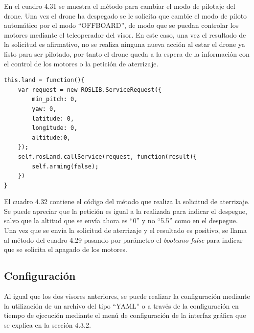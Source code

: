 En el cuadro 4.31 se muestra el método para cambiar el modo de pilotaje del drone. Una vez el drone ha despegado se le solicita que cambie el modo de piloto automático por el modo ``OFFBOARD'', de modo que se puedan controlar los motores mediante el teleoperador del visor. En este caso, una vez el resultado de la solicitud es afirmativo, no se realiza ninguna nueva acción al estar el drone ya listo para ser pilotado, por tanto el drone queda a la espera de la información con el control de los motores o la petición de aterrizaje.

\begin{lstlisting}[caption= Método para cambiar el modo de pilotaje, label=cod.setMode]
this.land = function(){
	var request = new ROSLIB.ServiceRequest({
		min_pitch: 0,
		yaw: 0,
		latitude: 0,
		longitude: 0,
		altitude:0,
	});
	self.rosLand.callService(request, function(result){
		self.arming(false);
	})
}
\end{lstlisting}

El cuadro 4.32 contiene el código del método que realiza la solicitud de aterrizaje. Se puede apreciar que la petición es igual a la realizada para indicar el despegue, salvo que la altitud que se envía ahora es ``0'' y no ``5.5'' como en el despegue. Una vez que se envía la solicitud de aterrizaje y el resultado es positivo, se llama al método del cuadro 4.29 pasando por parámetro el \textit{booleano false} para indicar que se solicita el apagado de los motores.

\subsection{Configuración}
Al igual que los dos visores anteriores, se puede realizar la configuración mediante la utilización de un archivo del tipo ``YAML'' o a través de la configuración en tiempo de ejecución mediante el menú de configuración de la interfaz gráfica que se explica en la sección 4.3.2.


